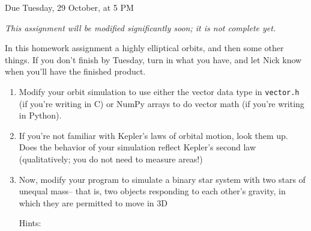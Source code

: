 \documentclass[12pt]{article}
\begin{document}
\Large
\centerline{}
\centerline{Due Tuesday, 29 October, at 5 PM}
\normalsize

\begin{center} \it This assignment will be modified significantly soon; it is not complete yet. \end{center}



In this homework assignment
a highly elliptical orbits, and then some other things. If you don't finish by Tuesday, turn in what you have, and let Nick know when you'll have the finished product. 

\begin{enumerate}

\item Modify your orbit simulation to use either the vector data type in {\tt vector.h} (if you're writing in C) or NumPy arrays to do vector math (if you're
writing in Python).

\item If you're not familiar with Kepler's laws of orbital motion, look them up. Does the
behavior of your simulation reflect Kepler's second law (qualitatively; you do not need
to measure areas!)
  
\item{Now, modify your program to simulate a binary star system with two stars
of unequal mass-- that is, two objects
responding to each other's gravity, in which they are permitted to move in 3D} 

    Hints:


\end{enumerate}
\end{document}
